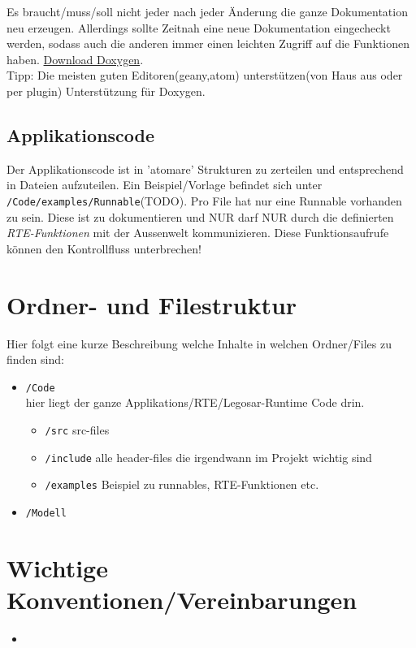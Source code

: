 \documentclass[]{scrartcl}
\begin{document}
Es braucht/muss/soll nicht jeder nach jeder Änderung die ganze Dokumentation neu erzeugen. Allerdings sollte Zeitnah eine neue Dokumentation eingecheckt werden, sodass auch die anderen immer einen leichten Zugriff auf die Funktionen haben. \href{http://www.stack.nl/~dimitri/doxygen/download.html}{Download Doxygen}.\\
Tipp: Die meisten guten Editoren(geany,atom) unterstützen(von Haus aus oder per plugin) Unterstützung für Doxygen.

\subsection{Applikationscode}
Der Applikationscode ist in 'atomare' Strukturen zu zerteilen und entsprechend in Dateien aufzuteilen. Ein Beispiel/Vorlage befindet sich unter \lstinline|/Code/examples/Runnable|(TODO).
Pro File hat nur eine Runnable vorhanden zu sein. Diese ist zu dokumentieren und NUR darf NUR durch die definierten \textit{RTE-Funktionen} mit der Aussenwelt kommunizieren. Diese Funktionsaufrufe können den Kontrollfluss unterbrechen!

\section{Ordner- und Filestruktur}
Hier folgt eine kurze Beschreibung welche Inhalte in welchen Ordner/Files zu finden sind:
\begin{itemize}
\item \lstinline|/Code|\\
	hier liegt der ganze Applikations/RTE/Legosar-Runtime Code drin. 
	\begin{itemize}
	\item \lstinline|/src| src-files
	\item \lstinline|/include| alle header-files die irgendwann im Projekt wichtig sind
	\item \lstinline|/examples| Beispiel zu runnables, RTE-Funktionen etc.
	\end{itemize}
\item \lstinline|/Modell|
\end{itemize}

\section{Wichtige Konventionen/Vereinbarungen}
\begin{itemize}
\item 
\end{itemize}
\end{document}
